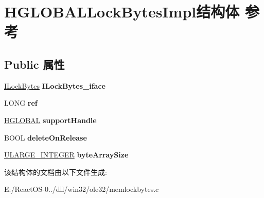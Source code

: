 \hypertarget{struct_h_g_l_o_b_a_l_lock_bytes_impl}{}\section{H\+G\+L\+O\+B\+A\+L\+Lock\+Bytes\+Impl结构体 参考}
\label{struct_h_g_l_o_b_a_l_lock_bytes_impl}
\subsection*{Public 属性}
\begin{DoxyCompactItemize}
\item 
\mbox{\label{struct_h_g_l_o_b_a_l_lock_bytes_impl_a9fbae3803cdf6096de854c32c3a39daa}} 
\hyperlink{interface_i_lock_bytes}{I\+Lock\+Bytes} {\bfseries I\+Lock\+Bytes\+\_\+iface}
\item 
\mbox{\label{struct_h_g_l_o_b_a_l_lock_bytes_impl_a9e4f7f670c60ed99b534c6d634a5d553}} 
L\+O\+NG {\bfseries ref}
\item 
\mbox{\label{struct_h_g_l_o_b_a_l_lock_bytes_impl_aaf20dadc738d0980112027d071debcd7}} 
\hyperlink{interfacevoid}{H\+G\+L\+O\+B\+AL} {\bfseries support\+Handle}
\item 
\mbox{\label{struct_h_g_l_o_b_a_l_lock_bytes_impl_aa61f13615e14438832ef7b89d4e2d5b5}} 
B\+O\+OL {\bfseries delete\+On\+Release}
\item 
\mbox{\label{struct_h_g_l_o_b_a_l_lock_bytes_impl_adb6c6767eda7f5e262d114d8be0c36d9}} 
\hyperlink{struct___u_l_a_r_g_e___i_n_t_e_g_e_r}{U\+L\+A\+R\+G\+E\+\_\+\+I\+N\+T\+E\+G\+ER} {\bfseries byte\+Array\+Size}
\end{DoxyCompactItemize}


该结构体的文档由以下文件生成\+:\begin{DoxyCompactItemize}
\item 
E\+:/\+React\+O\+S-\/0../dll/win32/ole32/memlockbytes.\+c\end{DoxyCompactItemize}
